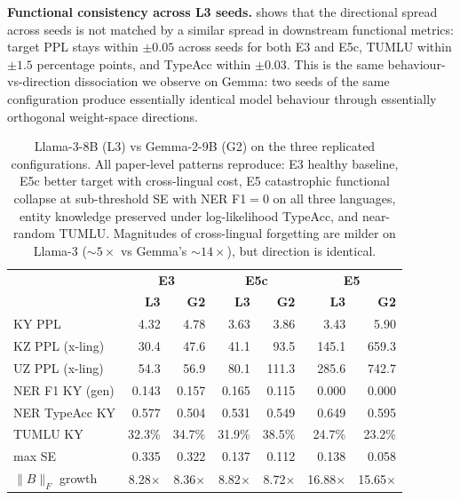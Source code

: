 \documentclass[11pt]{article}
\begin{document}
\textbf{Functional consistency across L3 seeds.}  shows that the directional spread across seeds is not matched by a similar spread in downstream functional metrics: target PPL stays within $\pm 0.05$ across seeds for both E3 and E5c, TUMLU within $\pm 1.5$ percentage points, and TypeAcc within $\pm 0.03$. This is the same behaviour-vs-direction dissociation we observe on Gemma: two seeds of the same configuration produce essentially identical model behaviour through essentially orthogonal weight-space directions.

\begin{table}[h]
\centering
\small
\begin{tabular}{lrr|rr|rr}
\toprule
& \multicolumn{2}{c|}{\textbf{E3}} & \multicolumn{2}{c|}{\textbf{E5c}} & \multicolumn{2}{c}{\textbf{E5}} \\
& \textbf{L3} & \textbf{G2} & \textbf{L3} & \textbf{G2} & \textbf{L3} & \textbf{G2} \\
\midrule
KY PPL          & 4.32   & 4.78   & 3.63   & 3.86   & 3.43   & 5.90   \\
KZ PPL (x-ling) & 30.4   & 47.6   & 41.1   & 93.5   & 145.1  & 659.3  \\
UZ PPL (x-ling) & 54.3   & 56.9   & 80.1   & 111.3  & 285.6  & 742.7  \\
NER F1 KY (gen) & 0.143  & 0.157  & 0.165  & 0.115  & 0.000  & 0.000  \\
NER TypeAcc KY  & 0.577  & 0.504  & 0.531  & 0.549  & 0.649  & 0.595  \\
TUMLU KY        & 32.3\% & 34.7\% & 31.9\% & 38.5\% & 24.7\% & 23.2\% \\
max SE          & 0.335  & 0.322  & 0.137  & 0.112  & 0.138  & 0.058  \\
$\|B\|_F$ growth & 8.28$\times$ & 8.36$\times$ & 8.82$\times$ & 8.72$\times$ & 16.88$\times$ & 15.65$\times$ \\
\bottomrule
\end{tabular}
\caption{Llama-3-8B (L3) vs Gemma-2-9B (G2) on the three replicated configurations. All paper-level patterns reproduce: E3 healthy baseline, E5c better target with cross-lingual cost, E5 catastrophic functional collapse at sub-threshold SE with NER F1$=0$ on all three languages, entity knowledge preserved under log-likelihood TypeAcc, and near-random TUMLU. Magnitudes of cross-lingual forgetting are milder on Llama-3 ($\sim 5\times$ vs Gemma's $\sim 14\times$), but direction is identical.}
\label{tab:llama3}
\end{table}
\end{document}
